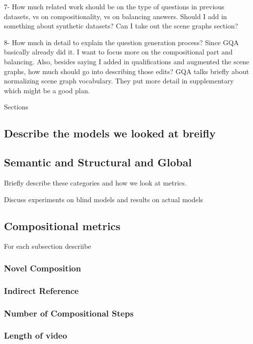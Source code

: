 \documentclass[10pt,twocolumn,letterpaper]{article}
\begin{document}
7- How much related work should be on the type of questions in previous datasets, vs on compositionality, vs on balancing answers. Should I add in something about synthetic datasets? Can I take out the scene graphs section?

8- How much in detail to explain the question generation process? Since GQA basically already did it. I want to focus more on the compositional part and balancing. Also, besides saying I added in qualifications and augmented the scene graphs, how much should go into describing those edits? GQA talks briefly about normalizing scene graph vocabulary. They put more detail in supplementary which might be a good plan.

Sections

\subsection{Describe the models we looked at breifly}

\subsection{Semantic and Structural and Global}

Briefly describe these categories and how we look at metrics.

Discuss experiments on blind models and results on actual models 

\subsection{Compositional metrics}

For each subsection descriibe 

\subsubsection{Novel Composition}

\subsubsection{Indirect Reference}

\subsubsection{Number of Compositional Steps}

\subsubsection{Length of video}
\end{document}
